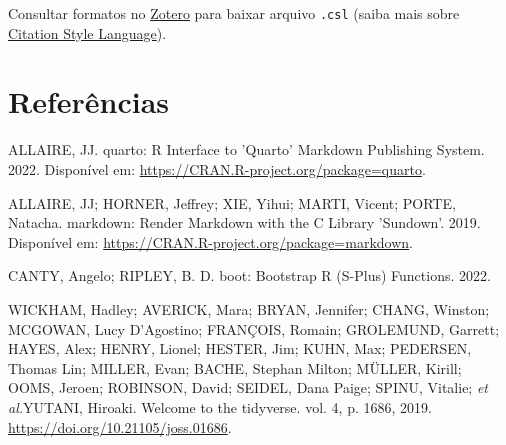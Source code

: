 \documentclass[
  a4paper,
]{report}
\newlength{\cslhangindent}
\newlength{\cslentryspacingunit} %
\newenvironment{CSLReferences}[2] %
 {%
  \setlength{\parindent}{0pt}
  \ifodd #1
  \let\oldpar\par
  \def\par{\hangindent=\cslhangindent\oldpar}
  \fi
  \setlength{\parskip}{#2\cslentryspacingunit}
 }%
 {}
\begin{document}
Consultar formatos no \href{https://www.zotero.org/styles}{Zotero} para
baixar arquivo \texttt{.csl} (saiba mais sobre
\href{https://en.wikipedia.org/wiki/Citation_Style_Language}{Citation
Style Language}).

\hypertarget{referuxeancias}{%
\chapter*{Referências}\label{referuxeancias}}

\hypertarget{refs}{}
\begin{CSLReferences}{0}{1}
\leavevmode{}%
ALLAIRE, JJ. quarto: R Interface to 'Quarto' Markdown Publishing System.
2022. Disponível em: \url{https://CRAN.R-project.org/package=quarto}.

\leavevmode{}%
ALLAIRE, JJ; HORNER, Jeffrey; XIE, Yihui; MARTI, Vicent; PORTE, Natacha.
markdown: Render Markdown with the C Library 'Sundown'. 2019. Disponível
em: \url{https://CRAN.R-project.org/package=markdown}.

\leavevmode{}%
CANTY, Angelo; RIPLEY, B. D. boot: Bootstrap R (S-Plus) Functions. 2022.

\leavevmode{}%
WICKHAM, Hadley; AVERICK, Mara; BRYAN, Jennifer; CHANG, Winston;
MCGOWAN, Lucy D'Agostino; FRANÇOIS, Romain; GROLEMUND, Garrett; HAYES,
Alex; HENRY, Lionel; HESTER, Jim; KUHN, Max; PEDERSEN, Thomas Lin;
MILLER, Evan; BACHE, Stephan Milton; MÜLLER, Kirill; OOMS, Jeroen;
ROBINSON, David; SEIDEL, Dana Paige; SPINU, Vitalie; \emph{et
al.}YUTANI, Hiroaki. Welcome to the
{\textbraceleft}tidyverse{\textbraceright}. vol. 4, p. 1686, 2019.
\url{https://doi.org/10.21105/joss.01686}.

\end{CSLReferences}
\end{document}
